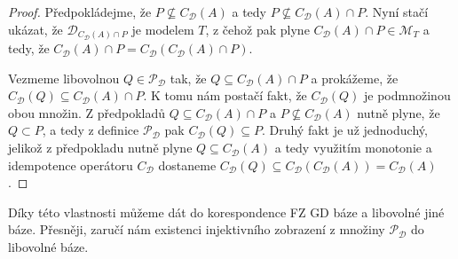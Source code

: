 \documentclass{article}
\theoremstyle {definition}
\begin{document}
\begin{proof}
  Předpokládejme, že $P \not\subseteq C_{\mathcal{D}}(A)$ a tedy $P
  \not\subseteq C_{\mathcal{D}}(A) \cap P$. Nyní stačí ukázat, že
  $\mathcal{D}_{C_{\mathcal{D}}(A) \cap P}$ je modelem $T$, z čehož
  pak plyne $C_{\mathcal{D}}(A) \cap P \in \mathcal{M}_T$ a tedy, že
  $C_{\mathcal{D}}(A) \cap P = C_{\mathcal{D}}(C_{\mathcal{D}}(A) \cap
  P)$.

  Vezmeme libovolnou $Q \in \mathcal P_{\mathcal{D}}$ tak, že $Q
  \subseteq C_{\mathcal{D}}(A) \cap P$ a prokážeme, že
  $C_{\mathcal{D}}(Q) \subseteq C_{\mathcal{D}}(A) \cap P$. K tomu nám
  postačí fakt, že $C_{\mathcal{D}}(Q)$ je podmnožinou obou množin. Z
  předpokladů $Q \subseteq C_{\mathcal{D}}(A) \cap P$ a $P
  \not\subseteq C_{\mathcal{D}}(A)$ nutně plyne, že $Q \subset P$, a
  tedy z definice $\mathcal P_{\mathcal{D}}$ pak $C_{\mathcal{D}}(Q)
  \subseteq P$. Druhý fakt je už jednoduchý, jelikož z předpokladu
  nutně plyne $Q \subseteq C_{\mathcal{D}}(A)$ a tedy využitím
  monotonie a idempotence operátoru $C_{\mathcal{D}}$ dostaneme
  $C_{\mathcal{D}}(Q) \subseteq C_{\mathcal{D}}(C_{\mathcal{D}}(A)) =
  C_{\mathcal{D}}(A)$.
\end{proof}

Díky této vlastnosti můžeme dát do korespondence FZ GD báze a
libovolné jiné báze. Přesněji, zaručí nám existenci injektivního
zobrazení z množiny $\mathcal P_{\mathcal{D}}$ do libovolné báze.
\end{document}
